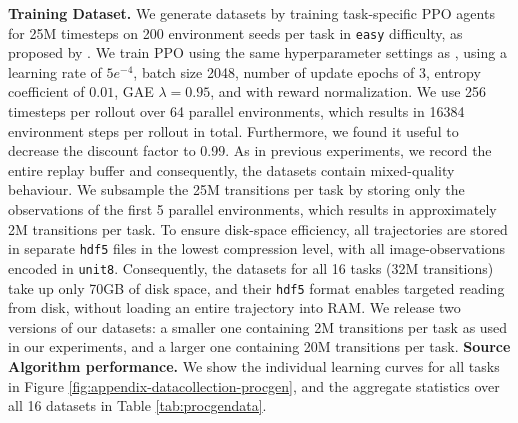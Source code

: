 \documentclass{article}
\begin{document}
\textbf{Training Dataset.}
We generate datasets by training task-specific PPO agents for 25M timesteps on 200 environment seeds per task in \texttt{easy} difficulty, as proposed by \citet{Cobbe:20}.
We train PPO using the same hyperparameter settings as \citet{Cobbe:20}, using a learning rate of $5e^{-4}$, batch size 2048, number of update epochs of 3, entropy coefficient of $0.01$, GAE $\lambda=0.95$, and with reward normalization.
We use 256 timesteps per rollout over 64 parallel environments, which results in 16384 environment steps per rollout in total.
Furthermore, we found it useful to decrease the discount factor to 0.99.
As in previous experiments, we record the entire replay buffer and consequently, the datasets contain mixed-quality behaviour.
We subsample the 25M transitions per task by storing only the observations of the first 5 parallel environments, which results in approximately 2M transitions per task.
To ensure disk-space efficiency, all trajectories are stored in separate \texttt{hdf5} files in the lowest compression level, with all image-observations encoded in \texttt{unit8}.
Consequently, the datasets for all 16 tasks (32M transitions) take up only 70GB of disk space, and their \texttt{hdf5} format enables targeted reading from disk, without loading an entire trajectory into RAM.
We release two versions of our datasets: a smaller one containing 2M transitions per task as used in our experiments, and a larger one containing 20M transitions per task.
\textbf{Source Algorithm performance.}
We show the individual learning curves for all tasks in Figure \ref{fig:appendix-datacollection-procgen}, and the aggregate statistics over all 16 datasets in Table \ref{tab:procgendata}.
\end{document}
